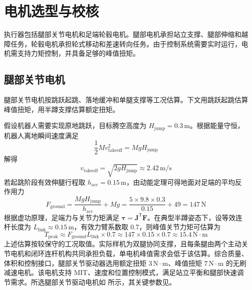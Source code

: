 \section{电机选型与校核}

执行器包括腿部关节电机和足端轮毂电机。腿部电机承担站立支撑、腿部伸缩和越障任务，轮毂电机承担轮式移动和差速转向任务。由于控制系统需要实时运行，电机需支持力矩控制，并具备足够的峰值扭矩。

\subsection{腿部关节电机}

腿部关节电机按跳跃起跳、落地缓冲和单腿支撑等工况估算。下文用跳跃起跳估算峰值扭矩，用半蹲支撑估算额定扭矩。

假设机器人需要实现原地跳跃，目标腾空高度为 $H_{\text{jump}} = 0.3\,\mathrm{m}$。根据能量守恒，机器人离地瞬间速度满足
\begin{equation}
  \frac{1}{2} M v_{\text{takeoff}}^2 = M g H_{\text{jump}}
\end{equation}
解得
\begin{equation}
  v_{\text{takeoff}} = \sqrt{2 g H_{\text{jump}}}
  \approx 2.42\,\mathrm{m/s}
\end{equation}
若起跳阶段有效伸腿行程取 $h_{\text{acc}} = 0.15\,\mathrm{m}$，由动能定理可得地面对足端的平均反作用力
\begin{equation}
  F_{\text{ground}} =
  \frac{M g H_{\text{jump}}}{h_{\text{acc}}} + Mg
  = \frac{5 \times 9.8 \times 0.3}{0.15} + 49
  = 147\,\mathrm{N}
\end{equation}
根据虚功原理，足端力与关节力矩满足 $\boldsymbol{\tau} = \boldsymbol{J}^{\mathsf{T}}\boldsymbol{F}$。在典型半蹲姿态下，设等效连杆长度为 $L_{\text{link}} \approx 0.15\,\mathrm{m}$，有效力臂系数取 0.7，则峰值关节力矩可估算为
\begin{equation}
  T_{\text{peak}} \approx
  F_{\text{ground}} L_{\text{link}} \times 0.7
  \approx 147 \times 0.15 \times 0.7
  \approx 15.4\,\mathrm{N\cdot m}
\end{equation}
上述估算按较保守的工况取值。实际样机为双腿协同支撑，且每条腿由两个主动关节电机和闭环连杆机构共同承担负载，单电机峰值需求会低于该估算。综合质量、体积和控制接口，腿部关节驱动器选用额定扭矩 $3\,\mathrm{N\cdot m}$、峰值扭矩 $7\,\mathrm{N\cdot m}$ 的无刷减速电机。该电机支持 MIT、速度和位置控制模式，满足站立平衡和腿部快速调节需求。所选腿部关节驱动电机如 所示，其关键参数见。

